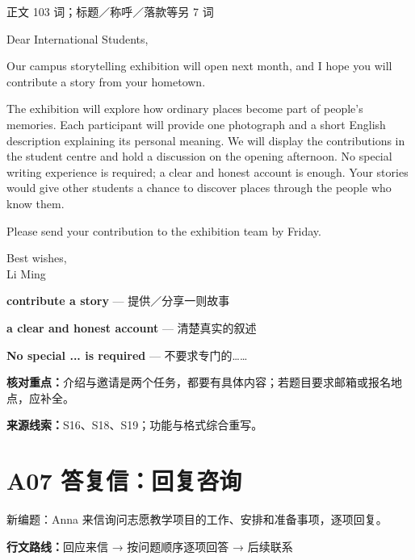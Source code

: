 \documentclass[11pt,a4paper,fontset=macnew]{ctexart}
\newenvironment{example}{\begingroup\fontsize{11}{14.3}\selectfont\setlength{\parskip}{4pt}}{\par\endgroup}
\begin{document}
{\small 正文 103 词；标题／称呼／落款等另 7 词}\par
\begin{example}
\noindent Dear International Students,\par
Our campus storytelling exhibition will open next month, and I hope you will contribute a story from your hometown.

The exhibition will explore how ordinary places become part of people's memories. Each participant will provide one photograph and a short English description explaining its personal meaning. We will display the contributions in the student centre and hold a discussion on the opening afternoon. No special writing experience is required; a clear and honest account is enough. Your stories would give other students a chance to discover places through the people who know them.

Please send your contribution to the exhibition team by Friday.

\noindent Best wishes,\\Li Ming\par
\end{example}
\par\vspace{4pt}{\bfseries 好词好句：优先记这三处}\par\nopagebreak
{\small\textbf{contribute a story} — 提供／分享一则故事}\par
{\small\textbf{a clear and honest account} — 清楚真实的叙述}\par
{\small\textbf{No special ... is required} — 不要求专门的……}\par
{\small\textbf{核对重点：}介绍与邀请是两个任务，都要有具体内容；若题目要求邮箱或报名地点，应补全。}\par
{\fontsize{8}{10}\selectfont\textbf{来源线索：}S16、S18、S19；功能与格式综合重写。}\par
\clearpage\section*{A07  答复信：回复咨询}
{\small 新编题：Anna 来信询问志愿教学项目的工作、安排和准备事项，逐项回复。}\par
{\small\textbf{行文路线：}回应来信 → 按问题顺序逐项回答 → 后续联系}\par
\par\vspace{4pt}{\bfseries 可替换模板}\par\nopagebreak
\end{document}
